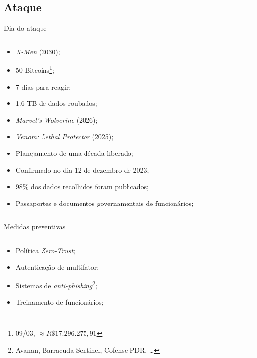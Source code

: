 \documentclass[bookmarks=false,aspectratio=169,9pt]{beamer}
\begin{document}
\subsection{Ataque}
\begin{frame}{Dia do ataque}
\begin{columns}
\begin{column}{0.5\textwidth}
\begin{itemize}
    \item \textit{X-Men} (2030)\cite{ign_insomniac};
	\item 50 Bitcoins\footnote{09/03, $\approx R\$17.296.275,91$};
    \item 7 dias para reagir;
    \item 1.6 TB de dados roubados\cite{engadget_insomniac};
    \item \textit{Marvel’s Wolverine} (2026);
    \item \textit{Venom: Lethal Protector} (2025)\cite{};
    \item Planejamento de uma década liberado;
	\item Confirmado no dia 12 de dezembro de 2023;
    \item 98\% dos dados recolhidos foram publicados;
    \item Passaportes e documentos governamentais de funcionários\cite{polygon_insomniac};
\end{itemize}
\end{column}
\end{columns}
\end{frame}
\begin{frame}{Medidas preventivas}
\begin{columns}
\begin{column}{0.5\textwidth}
\begin{itemize}
    \item Política \textit{Zero-Trust};
    \item Autenticação de multifator;
    \item Sistemas de \textit{anti-phishing}\cite{csoonline_antiphishing}\footnote{Avanan, Barracuda Sentinel, Cofense PDR, \dots};
    \item Treinamento de funcionários;
\end{itemize}
\end{column}
\end{columns}
\end{frame}
\end{document}
